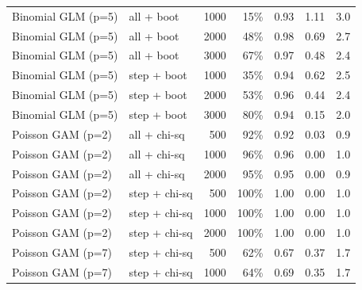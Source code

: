 \begin{tabular}{llrrrrr}
Binomial GLM (p=5) & all + boot & 1000 & 15\% & 0.93 & 1.11 & 3.0 \\
Binomial GLM (p=5) & all + boot & 2000 & 48\% & 0.98 & 0.69 & 2.7 \\
Binomial GLM (p=5) & all + boot & 3000 & 67\% & 0.97 & 0.48 & 2.4 \\
Binomial GLM (p=5) & step + boot & 1000 & 35\% & 0.94 & 0.62 & 2.5 \\
Binomial GLM (p=5) & step + boot & 2000 & 53\% & 0.96 & 0.44 & 2.4 \\
Binomial GLM (p=5) & step + boot & 3000 & 80\% & 0.94 & 0.15 & 2.0 \\
\midrule
Poisson GAM (p=2) & all + chi-sq & 500 & 92\% & 0.92 & 0.03 & 0.9 \\
Poisson GAM (p=2) & all + chi-sq & 1000 & 96\% & 0.96 & 0.00 & 1.0 \\
Poisson GAM (p=2) & all + chi-sq & 2000 & 95\% & 0.95 & 0.00 & 0.9 \\
Poisson GAM (p=2) & step + chi-sq & 500 & 100\% & 1.00 & 0.00 & 1.0 \\
Poisson GAM (p=2) & step + chi-sq & 1000 & 100\% & 1.00 & 0.00 & 1.0 \\
Poisson GAM (p=2) & step + chi-sq & 2000 & 100\% & 1.00 & 0.00 & 1.0 \\
\midrule
Poisson GAM (p=7) & step + chi-sq & 500 & 62\% & 0.67 & 0.37 & 1.7 \\
Poisson GAM (p=7) & step + chi-sq & 1000 & 64\% & 0.69 & 0.35 & 1.7 \\
\bottomrule
\end{tabular}
